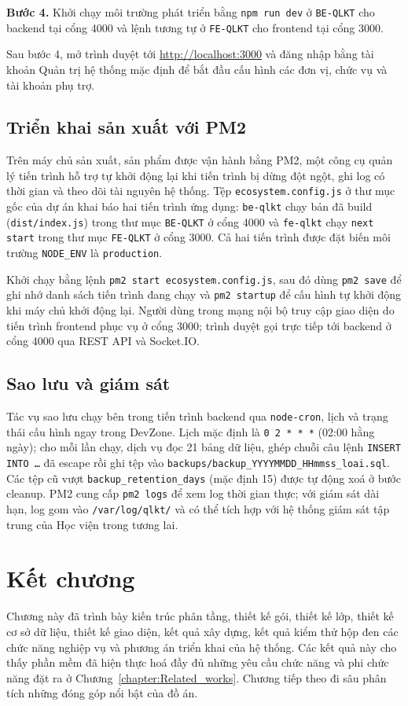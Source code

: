 \documentclass[../DoAn.tex]{subfiles}
\begin{document}
\textbf{Bước 4.} Khởi chạy môi trường phát triển bằng \texttt{npm run dev} ở \texttt{BE-QLKT} cho backend tại cổng 4000 và lệnh tương tự ở \texttt{FE-QLKT} cho frontend tại cổng 3000.

Sau bước 4, mở trình duyệt tới \url{http://localhost:3000} và đăng nhập bằng tài khoản Quản trị hệ thống mặc định để bắt đầu cấu hình các đơn vị, chức vụ và tài khoản phụ trợ.

\subsection{Triển khai sản xuất với PM2}
\label{subsection:4.5.3}

Trên máy chủ sản xuất, sản phẩm được vận hành bằng PM2, một công cụ quản lý tiến trình hỗ trợ tự khởi động lại khi tiến trình bị dừng đột ngột, ghi log có thời gian và theo dõi tài nguyên hệ thống. Tệp \texttt{ecosystem.config.js} ở thư mục gốc của dự án khai báo hai tiến trình ứng dụng: \texttt{be-qlkt} chạy bản đã build (\texttt{dist/index.js}) trong thư mục \texttt{BE-QLKT} ở cổng 4000 và \texttt{fe-qlkt} chạy \texttt{next start} trong thư mục \texttt{FE-QLKT} ở cổng 3000. Cả hai tiến trình được đặt biến môi trường \texttt{NODE\_ENV} là \texttt{production}.

Khởi chạy bằng lệnh \texttt{pm2 start ecosystem.config.js}, sau đó dùng \texttt{pm2 save} để ghi nhớ danh sách tiến trình đang chạy và \texttt{pm2 startup} để cấu hình tự khởi động khi máy chủ khởi động lại. Người dùng trong mạng nội bộ truy cập giao diện do tiến trình frontend phục vụ ở cổng 3000; trình duyệt gọi trực tiếp tới backend ở cổng 4000 qua REST API và Socket.IO.

\subsection{Sao lưu và giám sát}
\label{subsection:4.5.4}

Tác vụ sao lưu chạy bên trong tiến trình backend qua \texttt{node-cron}, lịch và trạng thái cấu hình ngay trong DevZone. Lịch mặc định là \texttt{0 2 * * *} (02:00 hằng ngày); cho mỗi lần chạy, dịch vụ đọc 21 bảng dữ liệu, ghép chuỗi câu lệnh \texttt{INSERT INTO \dots} đã escape rồi ghi tệp vào \texttt{backups/backup\_YYYYMMDD\_HHmmss\_loai.sql}. Các tệp cũ vượt \texttt{backup\_retention\_days} (mặc định 15) được tự động xoá ở bước cleanup. PM2 cung cấp \texttt{pm2 logs} để xem log thời gian thực; với giám sát dài hạn, log gom vào \texttt{/var/log/qlkt/} và có thể tích hợp với hệ thống giám sát tập trung của Học viện trong tương lai.

\section*{Kết chương}

Chương này đã trình bày kiến trúc phân tầng, thiết kế gói, thiết kế lớp, thiết kế cơ sở dữ liệu, thiết kế giao diện, kết quả xây dựng, kết quả kiểm thử hộp đen các chức năng nghiệp vụ và phương án triển khai của hệ thống. Các kết quả này cho thấy phần mềm đã hiện thực hoá đầy đủ những yêu cầu chức năng và phi chức năng đặt ra ở Chương~\ref{chapter:Related_works}. Chương tiếp theo đi sâu phân tích những đóng góp nổi bật của đồ án.
\end{document}
